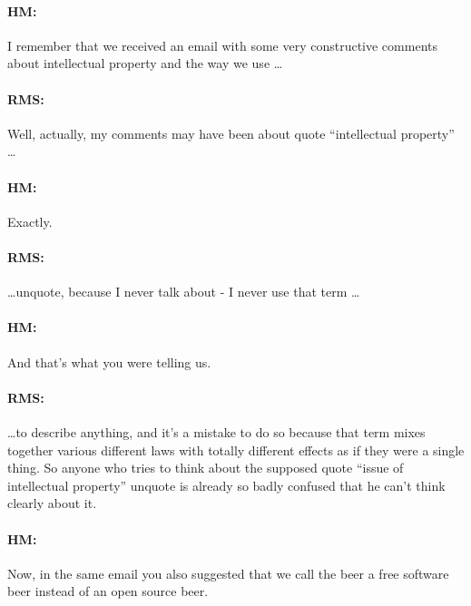\paragraph{HM:}{I remember that we received an email with some very constructive
comments about intellectual property and the way we use \dots}

\paragraph{RMS:}{Well, actually, my comments may have been about quote
``intellectual property'' \dots}

\paragraph{HM:}{Exactly.}

\paragraph{RMS:}{\dots unquote, because I never talk about - I never use that
term \dots}

\paragraph{HM:}{And that's what you were telling us.}

\paragraph{RMS:}{\dots to describe anything, and it's a mistake to do so because
that term mixes together various dif\hbox{}ferent laws with totally
dif\hbox{}ferent ef\hbox{}fects as if they were a single thing. So anyone who
tries to think about the supposed quote ``issue of intellectual property''
unquote is already so badly confused that he can't think clearly about it.}

\paragraph{HM:}{Now, in the same email you also suggested that we call the beer
a free software beer instead of an open source beer.}

